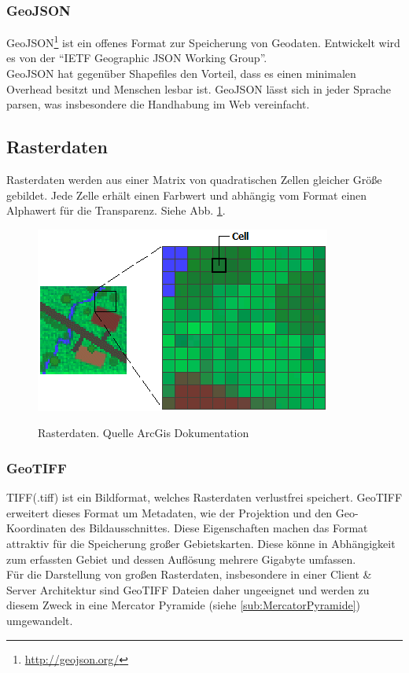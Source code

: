 \documentclass[10pt,conference,compsocconf]{IEEEtran}
\begin{document}
\subsubsection{GeoJSON}
GeoJSON\footnote{\url{http://geojson.org/}} ist ein offenes Format zur Speicherung von Geodaten. Entwickelt wird es von der \enquote{IETF Geographic JSON Working Group}. \\
GeoJSON hat gegenüber Shapefiles den Vorteil, dass es einen minimalen Overhead besitzt und Menschen lesbar ist. \mbox{GeoJSON} lässt sich in jeder Sprache parsen, was insbesondere die Handhabung im Web vereinfacht.


\subsection{Rasterdaten}
Rasterdaten werden aus einer Matrix von quadratischen Zellen gleicher Größe gebildet. Jede Zelle erhält einen Farbwert und abhängig vom Format einen Alphawert für die Transparenz. Siehe Abb. \ref{img:rasterdaten}. \\
\begin{figure}[H]
	\centering
	\includegraphics[width=0.75\columnwidth]{img/rasterdaten}\\
	\caption[]{Rasterdaten. Quelle ArcGis Dokumentation\footnotemark}
	\label{img:rasterdaten}
\end{figure}

\subsubsection{GeoTIFF}
TIFF(.tiff) ist ein Bildformat, welches Rasterdaten verlustfrei speichert. GeoTIFF erweitert dieses Format um Metadaten, wie der Projektion und den Geo-Koordinaten des Bildausschnittes. Diese Eigenschaften machen das Format attraktiv für die Speicherung großer Gebietskarten. Diese könne in Abhängigkeit zum erfassten Gebiet und dessen Auflösung mehrere Gigabyte umfassen. \\
Für die Darstellung von großen Rasterdaten, insbesondere in einer Client \& Server Architektur sind GeoTIFF Dateien daher ungeeignet und werden zu diesem Zweck in eine Mercator Pyramide (siehe \ref{sub:MercatorPyramide}) umgewandelt.
\end{document}
